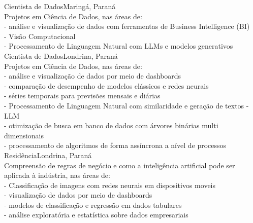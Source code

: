 \documentclass[
    10pt,
    english,
]{article}
\begin{document}
{Cientista de Dados}{Maringá, Paraná \\}{Projetos em Ciência de Dados, nas áreas de: \\
    \tab - análise e visualização de dados com ferramentas de Business Intelligence (BI) \\
    \tab - Visão Computacional \\
    \tab - Processamento de Linguagem Natural com LLMs e modelos generativos}
\\
{Cientista de Dados}{Londrina, Paraná \\}{Projetos em Ciência de Dados, nas áreas de: \\
    \tab - análise e visualização de dados por meio de dashboards \\
    \tab - comparação de desempenho de modelos clássicos e redes neurais \\
    \tab - séries temporais para previsões mensais e diárias \\
    \tab - Processamento de Linguagem Natural com similaridade e geração de textos - LLM \\
    \tab - otimização de busca em banco de dados com árvores binárias multi dimensionais \\
    \tab - processamento de algoritmos de forma assíncrona a nível de processos}
\\
{Residência}{Londrina, Paraná \\}{Compreensão de regras de negócio e como a inteligência artificial pode ser aplicada à indústria, nas áreas de: \\
    \tab - Classificação de imagens com redes neurais em dispositivos moveis \\
    \tab - visualização de dados por meio de dashboards \\
    \tab - modelos de classificação e regressão em dados tabulares \\
    \tab - análise exploratória e estatística sobre dados empresariais}

\end{document}

